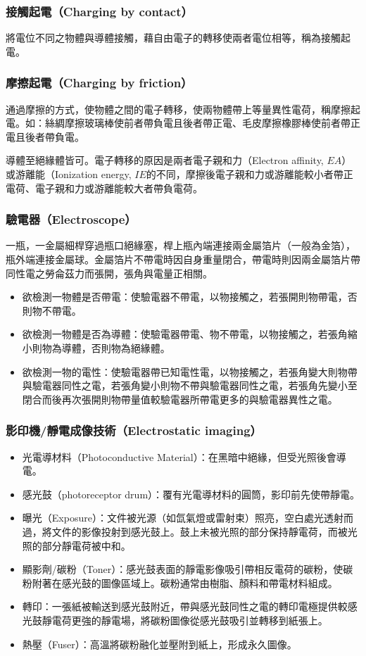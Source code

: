 \documentclass[a4paper,12pt]{report}
\begin{document}
\begin{itemize}
\subsubsection{接觸起電（Charging by contact）}
將電位不同之物體與導體接觸，藉自由電子的轉移使兩者電位相等，稱為接觸起電。
\subsubsection{摩擦起電（Charging by friction）}
通過摩擦的方式，使物體之間的電子轉移，使兩物體帶上等量異性電荷，稱摩擦起電。如：絲綢摩擦玻璃棒使前者帶負電且後者帶正電、毛皮摩擦橡膠棒使前者帶正電且後者帶負電。

導體至絕緣體皆可。電子轉移的原因是兩者電子親和力（Electron affinity, $EA$）或游離能（Ionization energy, $IE$的不同，摩擦後電子親和力或游離能較小者帶正電荷、電子親和力或游離能較大者帶負電荷。
\subsubsection{驗電器（Electroscope）}
一瓶，一金屬細桿穿過瓶口絕緣塞，桿上瓶內端連接兩金屬箔片（一般為金箔），瓶外端連接金屬球。金屬箔片不帶電時因自身重量閉合，帶電時則因兩金屬箔片帶同性電之勞侖茲力而張開，張角與電量正相關。
\begin{itemize}
\item 欲檢測一物體是否帶電：使驗電器不帶電，以物接觸之，若張開則物帶電，否則物不帶電。
\item 欲檢測一物體是否為導體：使驗電器帶電、物不帶電，以物接觸之，若張角縮小則物為導體，否則物為絕緣體。
\item 欲檢測一物的電性：使驗電器帶已知電性電，以物接觸之，若張角變大則物帶與驗電器同性之電，若張角變小則物不帶與驗電器同性之電，若張角先變小至閉合而後再次張開則物帶量值較驗電器所帶電更多的與驗電器異性之電。
\end{itemize}
\subsubsection{影印機/靜電成像技術（Electrostatic imaging）}
\begin{itemize}
\item 光電導材料（Photoconductive Material）：在黑暗中絕緣，但受光照後會導電。
\item 感光鼓（photoreceptor drum）：覆有光電導材料的圓筒，影印前先使帶靜電。
\item 曝光（Exposure）：文件被光源（如氙氣燈或雷射束）照亮，空白處光透射而過，將文件的影像投射到感光鼓上。鼓上未被光照的部分保持靜電荷，而被光照的部分靜電荷被中和。
\item 顯影劑/碳粉（Toner）：感光鼓表面的靜電影像吸引帶相反電荷的碳粉，使碳粉附著在感光鼓的圖像區域上。碳粉通常由樹脂、顏料和帶電材料組成。
\item 轉印：一張紙被輸送到感光鼓附近，帶與感光鼓同性之電的轉印電極提供較感光鼓靜電荷更強的靜電場，將碳粉圖像從感光鼓吸引並轉移到紙張上。
\item 熱壓（Fuser）：高溫將碳粉融化並壓附到紙上，形成永久圖像。
\end{itemize}

\end{itemize}
\end{document}
